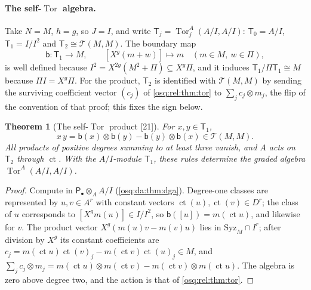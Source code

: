 \documentclass[11pt,letterpaper]{article}
\numberwithin{equation}{section}
\newtheorem{theorem}{Theorem}[section]
\theoremstyle{definition}
\theoremstyle{remark}
\theoremstyle{plain}
\newcommand{\ct}{\operatorname{ct}}
\newcommand{\Tor}{\operatorname{Tor}}
\newcommand{\src}[1]{\textup{\textsf{[#1]}}}
\begin{document}
\paragraph{The self-$\Tor$ algebra.} Take $N=M$, $h=g$, so $J=I$, and write $\mathsf T_j=\Tor^A_j(A/I,A/I)$: $\mathsf T_0=A/I$,
$\mathsf T_1=I/I^2$ and $\mathsf T_2\cong\mathcal T(M,M)$. The boundary map
\[
 \mathsf b:\mathsf T_1\longrightarrow M,\qquad [X^g(m+w)]\longmapsto m\quad(m\in M,\ w\in\Pi),
\]
is well defined because $I^2=X^{2g}(M^2+\Pi)\subseteq X^g\Pi$, and it induces $\mathsf T_1/\Pi\mathsf T_1\cong M$ because $\Pi I=X^g\Pi$. For
the product, $\mathsf T_2$ is identified with $\mathcal T(M,M)$ by sending the surviving coefficient vector $(c_j)$ of
\cref{osq:rel:thm:tor} to $\sum_jc_j\otimes m_j$, the flip of the convention of that proof; this fixes the sign below.

\begin{theorem}[The self-$\Tor$ product \src{21}]\label{osq:da:thm:product}
For $x,y\in\mathsf T_1$,
\[
 x\,y=\mathsf b(x)\otimes\mathsf b(y)-\mathsf b(y)\otimes\mathsf b(x)\in\mathcal T(M,M).
\]
All products of positive degrees summing to at least three vanish, and $A$ acts on $\mathsf T_2$ through $\ct$. With the $A/I$-module
$\mathsf T_1$, these rules determine the graded algebra $\Tor^A(A/I,A/I)$.
\end{theorem}
\begin{proof}
Compute in $\mathsf P_\bullet\otimes_AA/I$ (\cref{osq:da:thm:dga}). Degree-one classes are represented by $u,v\in A^r$ with constant vectors
$\ct(u),\ct(v)\in D^r$; the class of $u$ corresponds to $[X^gm(u)]\in I/I^2$, so $\mathsf b([u])=m(\ct u)$, and likewise for $v$. The product
vector $X^g(m(u)v-m(v)u)$ lies in $\mathrm{Syz}_M\cap I^r$; after division by $X^g$ its constant coefficients are
$c_j=m(\ct u)\ct(v)_j-m(\ct v)\ct(u)_j\in M$, and $\sum_jc_j\otimes m_j=m(\ct u)\otimes m(\ct v)-m(\ct v)\otimes m(\ct u)$. The algebra is zero
above degree two, and the action is that of \cref{osq:rel:thm:tor}.
\end{proof}
\end{document}
